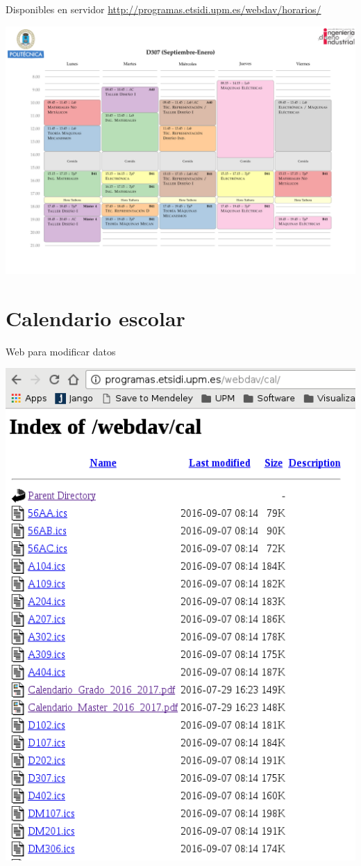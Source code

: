\documentclass[spanish, xcolor={usenames,svgnames,dvipsnames}]{beamer}
\begin{document}
\begin{frame}[label={sec:org11efe21}]{Disponibles en servidor}
\url{http://programas.etsidi.upm.es/webdav/horarios/}

\begin{center}
\includegraphics[width=.9\linewidth]{images/D307_1.pdf}
\end{center}
\end{frame}


\section{Calendario escolar}
\label{sec:orga88d95f}

\begin{frame}[label={sec:org5de1472}]{Web para modificar datos}
\begin{center}
\includegraphics[width=.9\linewidth]{images/webdav_cal.png}
\end{center}
\end{frame}
\end{document}
